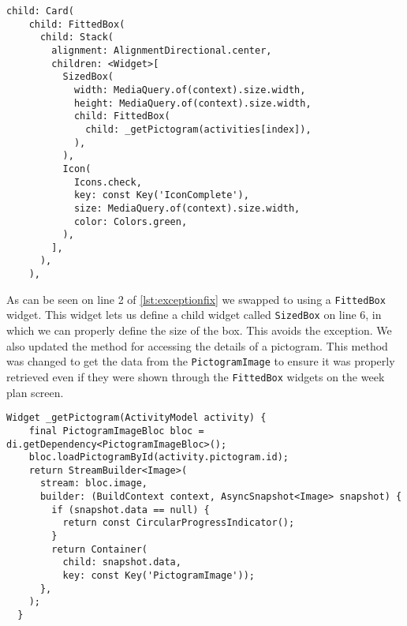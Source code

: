 \begin{lstlisting}[caption={An excerpt showing the use of FittedBox instead of PictogramImage},label={lst:exceptionfix}]
  child: Card(
    child: FittedBox(
      child: Stack(
        alignment: AlignmentDirectional.center,
        children: <Widget>[
          SizedBox(
            width: MediaQuery.of(context).size.width,
            height: MediaQuery.of(context).size.width,
            child: FittedBox(
              child: _getPictogram(activities[index]),
            ),
          ),
          Icon(
            Icons.check,
            key: const Key('IconComplete'),
            size: MediaQuery.of(context).size.width,
            color: Colors.green,
          ),
        ],
      ),
    ),
\end{lstlisting}
As can be seen on line 2 of \autoref{lst:exceptionfix} we swapped to using a \texttt{FittedBox} widget. This widget lets us define a child widget called \texttt{SizedBox} on line 6, in which we can properly define the size of the box. This avoids the exception.
We also updated the method for accessing the details of a pictogram.
This method was changed to get the data from the \texttt{PictogramImage} to ensure it was properly retrieved even if they were shown through the \texttt{FittedBox} widgets on the week plan screen.
\begin{lstlisting}[caption={The getPictogram method to retrieve the details of a pictogram},label={lst:getPictogram}]
  Widget _getPictogram(ActivityModel activity) {
    final PictogramImageBloc bloc = di.getDependency<PictogramImageBloc>();
    bloc.loadPictogramById(activity.pictogram.id);
    return StreamBuilder<Image>(
      stream: bloc.image,
      builder: (BuildContext context, AsyncSnapshot<Image> snapshot) {
        if (snapshot.data == null) {
          return const CircularProgressIndicator();
        }
        return Container(
          child: snapshot.data, 
          key: const Key('PictogramImage'));
      },
    );
  }
\end{lstlisting}

